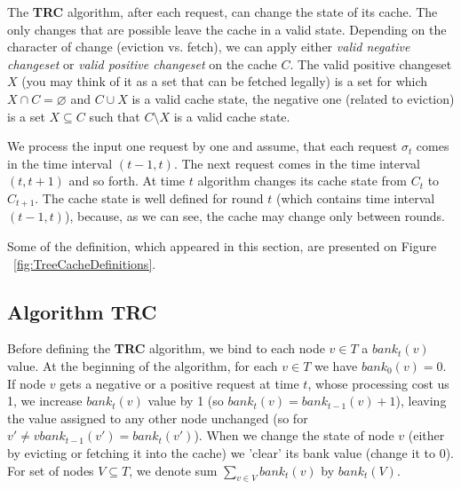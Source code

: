 The \textbf{TRC} algorithm, after each request, can change the state of its 
cache. The only changes that are possible leave the cache in a valid state. 
Depending on the character of change (eviction vs. fetch), we can apply either 
\textit{valid negative changeset} or \textit{valid positive changeset}  on the 
cache $C$. The valid positive changeset $X$ (you may think of it as a set that 
can be fetched legally) is a set for which $X \cap C = \varnothing$ and $C \cup X$ 
is a valid cache state, the negative one (related to eviction) is a set $X 
\subseteq C$ such that $C \setminus X$ is a valid cache state.

We process the input one request by one and assume, that each request $\sigma_t$ 
comes in the time interval $(t-1, t)$. The next request comes in the time 
interval $(t, t + 1)$ and so forth. At time $t$ algorithm changes its cache state 
from $C_{t}$ to $C_{t+1}$. The cache state is well defined for round $t$ (which 
contains time interval $(t-1, t)$), because, as we can see, the cache may change 
only between rounds.

Some of the definition, which appeared in this section, are presented on Figure ~\ref{fig:TreeCacheDefinitions}.



\subsection{Algorithm TRC}

Before defining the \textbf{TRC} algorithm, we bind to each node $v \in 
T$ a $bank_{t}(v)$ value. At the beginning of the algorithm, for each $v \in T$ we 
have $bank_{0}(v) = 0$. If node $v$ gets a negative or a positive request at 
time $t$, whose processing cost us 1, we increase $bank_{t}(v)$ value by 1 
(so $bank_{t}(v) = bank_{t-1}(v) + 1$), leaving the value assigned to any other 
node unchanged (so for $v' \neq v bank_{t-1}(v') = bank_{t}(v')$). When we change 
the state of node $v$ (either by evicting or fetching it into the cache) we 'clear' 
its bank value (change it to $0$). For set of nodes $V \subseteq T$, we denote sum 
$\sum_{v \in V} bank_{t}(v)$ by $bank_{t}(V)$.

